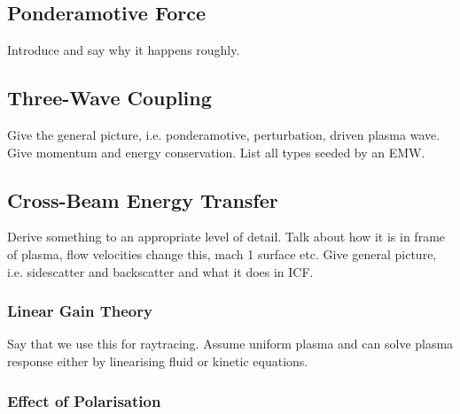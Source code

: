 \subsection{Ponderamotive Force}%
\label{sec:theory_ponderamotive}

Introduce and say why it happens roughly.

\subsection{Three-Wave Coupling}%
\label{sec:theory_threewave}

Give the general picture, i.e. ponderamotive, perturbation, driven plasma wave.
Give momentum and energy conservation.
List all types seeded by an EMW.

\subsection{Cross-Beam Energy Transfer}%
\label{sec:theory_CBET}

Derive something to an appropriate level of detail.
Talk about how it is in frame of plasma, flow velocities change this, mach 1 surface etc.
Give general picture, i.e. sidescatter and backscatter and what it does in ICF.


\subsubsection{Linear Gain Theory}%
\label{sec:theory_lineargaincbet}

Say that we use this for raytracing.
Assume uniform plasma and can solve plasma response either by linearising fluid or kinetic equations.

\subsubsection{Effect of Polarisation}%
\label{sec:theory_cbet_polarisation}

